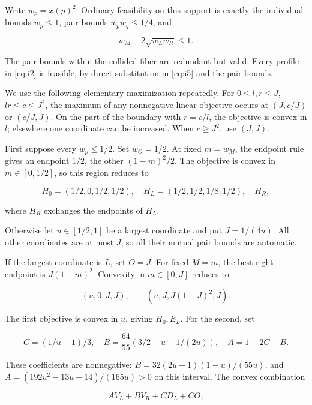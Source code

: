 Write \(w_p=x(p)^2\). Ordinary feasibility on this support is exactly the
individual bounds \(w_p\le1\), pair bounds \(w_pw_q\le1/4\), and

\begin{equation}\label{eq:i5}
w_M+2\sqrt{w_Lw_R}\le1.
\end{equation}

The pair bounds within the collided fiber are redundant but valid. Every
profile in \eqref{eq:i2} is feasible, by direct substitution in \eqref{eq:i5} and the pair bounds.

We use the following elementary maximization repeatedly. For
\(0\le l,r\le J\), \(lr\le c\le J^2\), the maximum of any nonnegative
linear objective occurs at \((J,c/J)\) or \((c/J,J)\). On the part of the
boundary with \(r=c/l\), the objective is convex in \(l\); elsewhere one
coordinate can be increased. When \(c\ge J^2\), use \((J,J)\).

First suppose every \(w_p\le1/2\). Set \(w_O=1/2\). At fixed
\(m=w_M\), the endpoint rule gives an endpoint \(1/2\), the other
\((1-m)^2/2\). The objective is convex in \(m\in[0,1/2]\), so this region
reduces to

\begin{equation}\label{eq:i6}
H_0=(1/2,0,1/2,1/2),\quad H_L=(1/2,1/2,1/8,1/2),\quad H_R,
\end{equation}

where \(H_R\) exchanges the endpoints of \(H_L\).

Otherwise let \(u\in[1/2,1]\) be a largest coordinate and put \(J=1/(4u)\).
All other coordinates are at most \(J\), so all their mutual pair bounds
are automatic.

If the largest coordinate is \(L\), set \(O=J\). For fixed \(M=m\),
the best right endpoint is \(J(1-m)^2\). Convexity in \(m\in[0,J]\)
reduces to

\begin{equation}\label{eq:i7}
(u,0,J,J),\qquad (u,J,J(1-J)^2,J).
\end{equation}

The first objective is convex in \(u\), giving \(H_0,E_L\). For the second,
set

\[
C=(1/u-1)/3,\quad B=\frac{64}{55}(3/2-u-1/(2u)),\quad A=1-2C-B.
\]

These coefficients are nonnegative:
\(B=32(2u-1)(1-u)/(55u)\), and
\(A=(192u^2-13u-14)/(165u)>0\) on this interval. The convex combination

\[
A V_L+B V_R+C D_L+C O_1
\]

